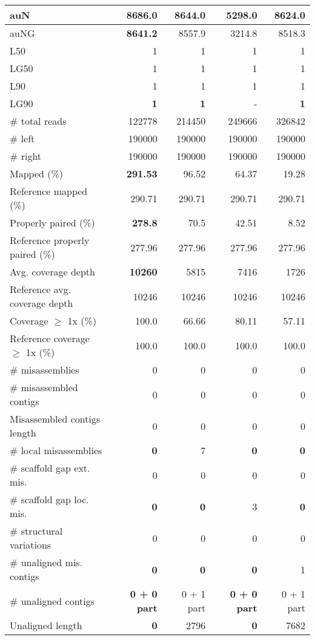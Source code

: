 \documentclass[12pt,a4paper]{article}
\begin{document}
\begin{table}[ht]
\begin{center}
\begin{tabular}{|l*{4}{|r}|}
auN & {\bf 8686.0} & 8644.0 & 5298.0 & 8624.0 \\ \hline
auNG & {\bf 8641.2} & 8557.9 & 3214.8 & 8518.3 \\ \hline
L50 & 1 & 1 & 1 & 1 \\ \hline
LG50 & 1 & 1 & 1 & 1 \\ \hline
L90 & 1 & 1 & 1 & 1 \\ \hline
LG90 & {\bf 1} & {\bf 1} & - & {\bf 1} \\ \hline
\# total reads & 122778 & 214450 & 249666 & 326842 \\ \hline
\# left & 190000 & 190000 & 190000 & 190000 \\ \hline
\# right & 190000 & 190000 & 190000 & 190000 \\ \hline
Mapped (\%) & {\bf 291.53} & 96.52 & 64.37 & 19.28 \\ \hline
Reference mapped (\%) & 290.71 & 290.71 & 290.71 & 290.71 \\ \hline
Properly paired (\%) & {\bf 278.8} & 70.5 & 42.51 & 8.52 \\ \hline
Reference properly paired (\%) & 277.96 & 277.96 & 277.96 & 277.96 \\ \hline
Avg. coverage depth & {\bf 10260} & 5815 & 7416 & 1726 \\ \hline
Reference avg. coverage depth & 10246 & 10246 & 10246 & 10246 \\ \hline
Coverage $\geq$ 1x (\%) & 100.0 & 66.66 & 80.11 & 57.11 \\ \hline
Reference coverage $\geq$ 1x (\%) & 100.0 & 100.0 & 100.0 & 100.0 \\ \hline
\# misassemblies & 0 & 0 & 0 & 0 \\ \hline
\# misassembled contigs & 0 & 0 & 0 & 0 \\ \hline
Misassembled contigs length & 0 & 0 & 0 & 0 \\ \hline
\# local misassemblies & {\bf 0} & 7 & {\bf 0} & {\bf 0} \\ \hline
\# scaffold gap ext. mis. & 0 & 0 & 0 & 0 \\ \hline
\# scaffold gap loc. mis. & {\bf 0} & {\bf 0} & 3 & {\bf 0} \\ \hline
\# structural variations & 0 & 0 & 0 & 0 \\ \hline
\# unaligned mis. contigs & {\bf 0} & {\bf 0} & {\bf 0} & 1 \\ \hline
\# unaligned contigs & {\bf 0 + 0 part} & 0 + 1 part & {\bf 0 + 0 part} & 0 + 1 part \\ \hline
Unaligned length & {\bf 0} & 2796 & {\bf 0} & 7682 \\ \hline

\end{tabular}
\end{center}
\end{table}
\end{document}
